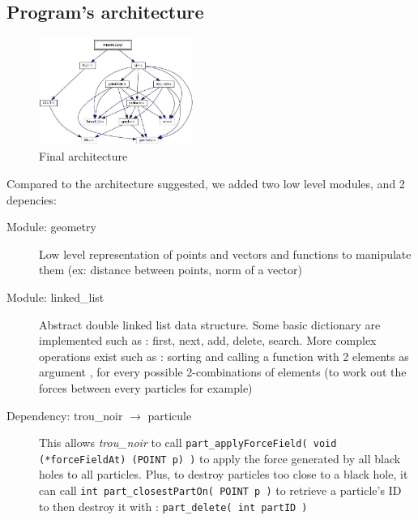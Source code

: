 \documentclass[a4paper]{article} %
\begin{document}
\begin{multicols*}{2}
\section{Program's architecture}


\begin{figure}[H]
\centering
\includegraphics[width=0.45\textwidth]{architecture.jpg}
\caption{Final architecture}
\end{figure}


Compared to the architecture suggested, we added two low level modules, and 2 depencies:
\begin{description}
\item[Module: geometry]
Low level representation of points and vectors and functions to manipulate them (ex: distance between points, norm of a vector)


\item[Module: linked\_list]
Abstract double linked list data structure.
Some basic dictionary are implemented such as : first, next, add, delete, search.
More complex operations exist such as : sorting and calling a function with 2 elements as argument , for every possible 2-combinations of elements
(to work out the forces between every particles for example)


\item[Dependency: trou\_noir $\rightarrow$ particule]
This allows \emph{trou\_noir} to call \texttt{part\_applyForceField( void (*forceFieldAt) (POINT p) )}
to apply the force generated by all black holes to all particles.
Plus, to destroy particles too close to a black hole, it can call \texttt{int part\_closestPartOn( POINT p )}
to retrieve a particle's ID to then destroy it with : \texttt{part\_delete( int partID )}


\end{description}
\end{multicols*}
\end{document}
